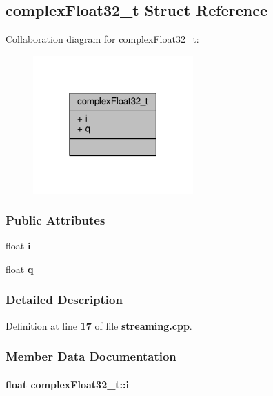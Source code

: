 \subsection{complex\+Float32\+\_\+t Struct Reference}
\label{structcomplexFloat32__t}


Collaboration diagram for complex\+Float32\+\_\+t\+:
\nopagebreak
\begin{figure}[H]
\begin{center}
\leavevmode
\includegraphics[width=174pt]{d2/d0f/structcomplexFloat32__t__coll__graph}
\end{center}
\end{figure}
\subsubsection*{Public Attributes}
\begin{DoxyCompactItemize}
\item 
float {\bf i}
\item 
float {\bf q}
\end{DoxyCompactItemize}


\subsubsection{Detailed Description}


Definition at line {\bf 17} of file {\bf streaming.\+cpp}.



\subsubsection{Member Data Documentation}
\paragraph[{i}]{\setlength{\rightskip}{0pt plus 5cm}float complex\+Float32\+\_\+t\+::i}\label{structcomplexFloat32__t_ae3996dd6850becb53d3bf166843028b5}


